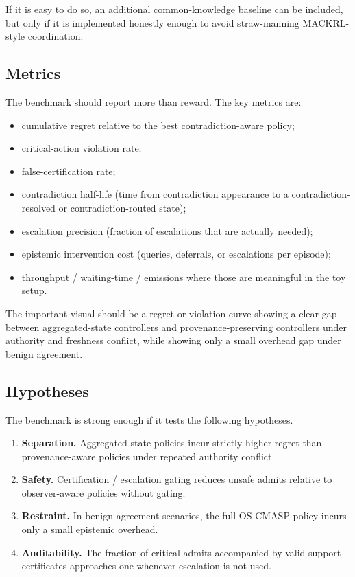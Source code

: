 \documentclass[11pt]{article}
\newcommand{\1}{\mathbf{1}}
\theoremstyle{definition}
\theoremstyle{plain}
\theoremstyle{remark}
\begin{document}
If it is easy to do so, an additional common-knowledge baseline can be included, but only if it is implemented honestly enough to avoid straw-manning MACKRL-style coordination.

\subsection{Metrics}

The benchmark should report more than reward. The key metrics are:

\begin{itemize}[leftmargin=1.5em]
\item cumulative regret relative to the best contradiction-aware policy;
\item critical-action violation rate;
\item false-certification rate;
\item contradiction half-life (time from contradiction appearance to a contradiction-resolved or contradiction-routed state);
\item escalation precision (fraction of escalations that are actually needed);
\item epistemic intervention cost (queries, deferrals, or escalations per episode);
\item throughput / waiting-time / emissions where those are meaningful in the toy setup.
\end{itemize}

The important visual should be a regret or violation curve showing a clear gap between aggregated-state controllers and provenance-preserving controllers under authority and freshness conflict, while showing only a small overhead gap under benign agreement.

\subsection{Hypotheses}

The benchmark is strong enough if it tests the following hypotheses.

\begin{enumerate}[leftmargin=1.7em,label=\textbf{H\arabic*:}]
\item \textbf{Separation.} Aggregated-state policies incur strictly higher regret than provenance-aware policies under repeated authority conflict.
\item \textbf{Safety.} Certification / escalation gating reduces unsafe admits relative to observer-aware policies without gating.
\item \textbf{Restraint.} In benign-agreement scenarios, the full OS-CMASP policy incurs only a small epistemic overhead.
\item \textbf{Auditability.} The fraction of critical admits accompanied by valid support certificates approaches one whenever escalation is not used.
\end{enumerate}
\end{document}
